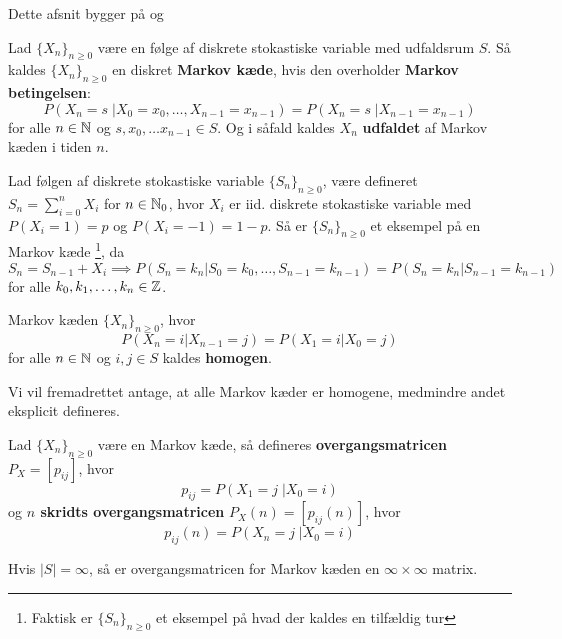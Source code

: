 Dette afsnit bygger på \cite{sandsynlighedsBog} og \cite{grimsandsynlighedsBog}
\begin{defn}
Lad $\{X_n\}_{n  \geq 0}$ være en følge af diskrete stokastiske variable med udfaldsrum $S$. Så kaldes $\{X_n\}_{n \geq 0}$ en diskret \textbf{Markov kæde}, hvis den overholder \textbf{Markov betingelsen}:
\begin{equation*}
    P(X_n = s \;| X_0 = x_0, \ldots, X_{n - 1} = x_{n - 1}) = P(X_n = s \;| X_{n - 1} = x_{n - 1})
\end{equation*}
for alle $n \in \mathbb{N}$ og $s, x_0, \ldots x_{n - 1} \in S$. Og i såfald kaldes $X_n$ \textbf{udfaldet} af Markov kæden i tiden $n$.
\end{defn}
\begin{exmp} Lad følgen af diskrete stokastiske variable $\{S_{n}\}_{n \geq 0}$, være defineret $S_{n} = \sum_{i=0}^n X_{i}$ for $n \in \mathbb{N}_{0}$, hvor $X_{i}$ er iid. diskrete stokastiske variable med $P(X_{i} = 1) = p$ og $P(X_{i} = -1) = 1 - p$. Så er $\{S_{n}\}_{n \geq 0}$ et eksempel på en Markov kæde \footnote{Faktisk er $\{S_{n}\}_{n \geq 0}$ et eksempel på hvad der kaldes en tilfældig tur}, da
  \begin{equation*}
    S_{n} = S_{n - 1} + X_{i} \implies P(S_{n} = k_{n} | S_{0} = k_{0}, \ldots, S_{n - 1} = k_{n - 1}) = P(S_{n} = k_{n} | S_{n - 1} = k_{n - 1})
  \end{equation*}
  for alle $k_{0}, k_{1}, \ldots, k_{n} \in \mathbb{Z}$.
\end{exmp}
\begin{defn}
  Markov kæden $\{X_n\}_{n \geq 0}$, hvor
    \begin{equation*}
      P(X_n = i | X_{n - 1} = j) = P(X_1 = i | X_0 = j)
  \end{equation*}
  for alle $n \in \mathbb{N}$ og $i, j \in S$ kaldes \textbf{homogen}.
{
}\end{defn}
Vi vil fremadrettet antage, at alle Markov kæder er homogene, medmindre andet eksplicit defineres.
\begin{defn}
Lad $\{X_n\}_{n \geq 0}$ være en Markov kæde, så defineres \textbf{overgangsmatricen} $P_X = [p_{ij}]$, hvor 
\begin{equation*}
    p_{ij} = P(X_1 = j \;| X_0 = i)
\end{equation*}
og \textbf{$n$ skridts overgangsmatricen} $P_X(n) = [p_{ij}(n)]$, hvor
\begin{equation*}
    p_{ij}(n) = P(X_n = j \;| X_0 = i)
\end{equation*}
\end{defn}
\begin{remark}
  Hvis $|S| = \infty$, så er overgangsmatricen for Markov kæden en $\infty \times \infty$ matrix.
\end{remark}

